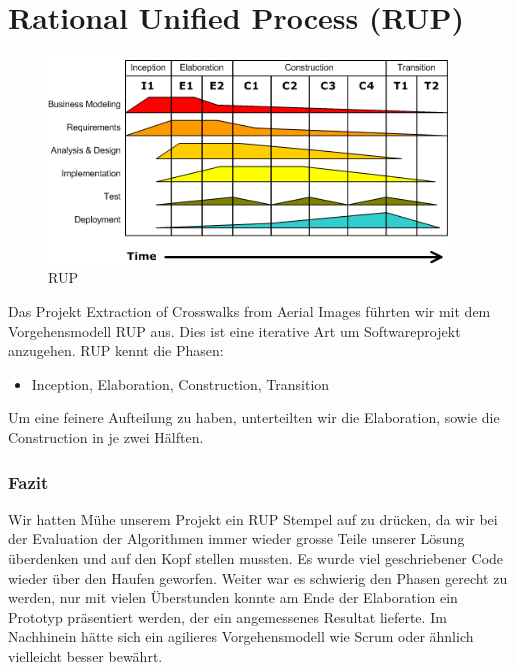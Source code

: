 \section{Rational Unified Process (RUP)}

\begin{figure}[H]
\centering
\includegraphics[width=300pt]{images/rup.png}
\caption[RUP]{RUP}
\end{figure}

Das Projekt Extraction of Crosswalks from Aerial Images führten wir mit dem Vorgehensmodell RUP \cite{RUP} aus.
Dies ist eine iterative Art um Softwareprojekt anzugehen. RUP kennt die Phasen:

\begin{itemize}
	\item Inception, Elaboration, Construction, Transition
\end{itemize}

Um eine feinere Aufteilung zu haben, unterteilten wir die Elaboration, sowie die Construction in je zwei Hälften. 

\subsubsection{Fazit}
Wir hatten Mühe unserem Projekt ein RUP Stempel auf zu drücken, da wir bei der Evaluation der Algorithmen immer wieder grosse Teile unserer Lösung überdenken und auf den Kopf stellen mussten. Es wurde viel geschriebener Code wieder über den Haufen geworfen. Weiter war es schwierig den Phasen gerecht zu werden, nur mit vielen Überstunden konnte am Ende der Elaboration ein Prototyp präsentiert werden, der ein angemessenes Resultat lieferte. Im Nachhinein hätte sich ein agilieres Vorgehensmodell wie Scrum oder ähnlich vielleicht besser bewährt.
 

